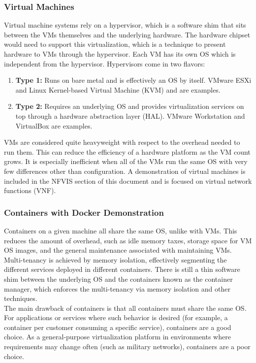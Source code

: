 \subsubsection{Virtual Machines}
Virtual machine systems rely on a hypervisor, which is a software shim that
sits between the VMs themselves and the underlying hardware. The hardware
chipset would need to support this virtualization, which is a technique to
present hardware to VMs through the hypervisor. Each VM has its own OS which
is independent from the hypervisor. Hypervisors come in two flavors:

\begin{enumerate}
  \item \textbf{Type 1:} Runs on bare metal and is effectively an OS by
  itself. VMware ESXi and Linux Kernel-based  Virtual Machine (KVM) and are
  examples.
  \item \textbf{Type 2:} Requires an underlying OS and provides virtualization
  services on top through a hardware abstraction layer (HAL). VMware
  Workstation and VirtualBox are examples.
\end{enumerate}

VMs are considered quite heavyweight with respect to the overhead needed to
run them. This can reduce the efficiency of a hardware platform as the VM
count grows. It is especially inefficient when all of the VMs run the same OS
with very few differences other than configuration. A demonstration of
virtual machines is included in the NFVIS section of this document and is
focused on virtual network functions (VNF).

\subsubsection{Containers with Docker Demonstration}
Containers on a given machine all share the same OS, unlike with VMs. This
reduces the amount of overhead, such as idle memory taxes, storage space for
VM OS images, and the general maintenance associated with maintaining VMs.
Multi-tenancy is achieved by memory isolation, effectively segmenting the
different services deployed in different containers. There is still a thin
software shim between the underlying OS and the containers known as the
container manager, which enforces the multi-tenancy via memory isolation and
other techniques. \\

The main drawback of containers is that all containers must share the same OS.
For applications or services where such behavior is desired (for example, a
container per customer consuming a specific service), containers are a good
choice. As a general-purpose virtualization platform in environments where
requirements may change often (such as military networks), containers are a
poor choice. \\

